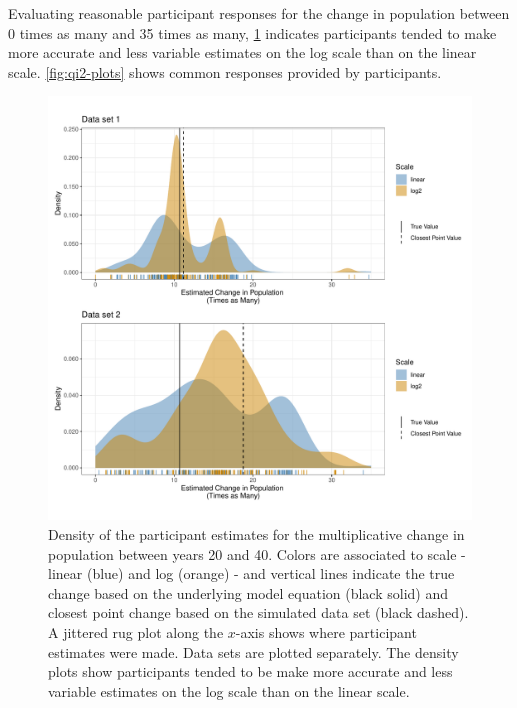 \documentclass[print]{nuthesis}
\begin{document}
Evaluating reasonable participant responses for the change in population between 0 times as many and 35 times as many, \cref{fig:qi2-density} indicates participants tended to make more accurate and less variable estimates on the log scale than on the linear scale.
\cref{fig:qi2-plots} shows common responses provided by participants.

\begin{figure}[tbp]

{\centering \includegraphics[width=1\linewidth,]{thesis_files/figure-latex/qi2-density-1} 

}

\caption[Intermediate Q2 density]{Density of the participant estimates for the multiplicative change in population between years 20 and 40. Colors are associated to scale - linear (blue) and log (orange) - and vertical lines indicate the true change based on the underlying model equation (black solid) and closest point change based on the simulated data set (black dashed). A jittered rug plot along the $x$-axis shows where participant estimates were made. Data sets are plotted separately. The density plots show participants tended to be make more accurate and less variable estimates on the log scale than on the linear scale.}\label{fig:qi2-density}
\end{figure}
\end{document}
